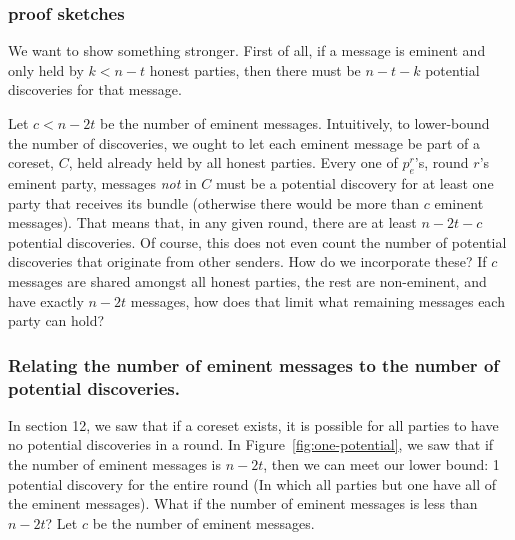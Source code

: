 \documentclass{article}
\begin{document}
\subsubsection{proof sketches}

We want to show something stronger. First of all, if a message is eminent and only held by $k < n - t$ honest parties, then there must be $n - t - k$ potential discoveries for that message.

Let $c < n - 2t$ be the number of eminent messages. Intuitively, to lower-bound the number of discoveries, we ought to let each eminent message be part of a coreset, $C$, held already held by all honest parties. Every one of $p_e^r$'s, round $r$'s eminent party, messages \emph{not} in $C$ must be a potential discovery for at least one party that receives its bundle (otherwise there would be more than $c$ eminent messages). That means that, in any given round, there are at least $n - 2t - c$ potential discoveries. Of course, this does not even count the number of potential discoveries that originate from other senders. How do we incorporate these? If $c$ messages are shared amongst all honest parties, the rest are non-eminent, and have exactly $n - 2t$ messages, how does that limit what remaining messages each party can hold?

\subsubsection{Relating the number of eminent messages to the number of potential discoveries.}
In section 12, we saw that if a coreset exists, it is possible for all parties to have no potential discoveries in a round. In Figure~\ref{fig:one-potential}, we saw that if the number of eminent messages is $n - 2t$, then we can meet our lower bound: 1 potential discovery for the entire round (In which all parties but one have all of the eminent messages). What if the number of eminent messages is less than $n - 2t$? Let $c$ be the number of eminent messages.
\end{document}
